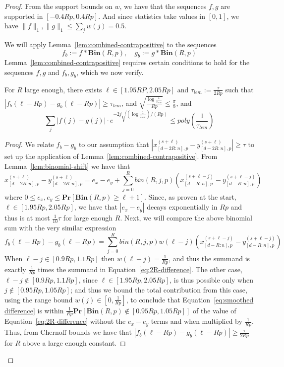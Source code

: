 \documentclass[11pt]{article}
\theoremstyle{plain}
\newcommand{\Bin}[2]{\textbf{Bin}(#1,#2)}
\newcommand{\abs}[1]{\left|#1\right|}
\renewcommand{\Pr}{\textbf{Pr}}
\begin{document}
\begin{proof}
From the support bounds on $w$, we have that the sequences $f,g$ are supported in $[-0.4Rp,0.4Rp]$. And since statistics take values in $[0,1]$, we have $\|f\|_1,\|g\|_1\leq \sum_j w(j) =0.5$. 

We will apply Lemma~\ref{lem:combined-contrapositive} to the sequences
\begin{equation*}
    f_b := f \ast \Bin{R}{p}, \quad g_b := g \ast \Bin{R}{p}
\end{equation*}
Lemma~\ref{lem:combined-contrapositive} requires certain conditions to hold for the sequences $f,g$ and $f_b,g_b$, which we now verify.

\begin{lemma}
    \label{lem:contrapositive-conditions}
    For $R$ large enough, there exists $\ell \in [1.95RP,2.05Rp]$ and $\tau_{lem} := \frac{\tau}{2Rp}$ such that $\abs{f_b(\ell-Rp) - g_b(\ell-Rp)} \geq \tau_{lem}$, and $\sqrt{\frac{\log \frac{1}{\tau_{lem}}}{Rp}} \leq \frac{\pi}{8}$, and \begin{equation}
        \label{eq:left-tail}
        \sum_j |f(j)-g(j)|\cdot e^{-2j\sqrt{(\log\frac{1}{\tau_{lem}})/(Rp)}}\leq poly\left(\frac{1}{\tau_{lem}}\right)
    \end{equation}
\end{lemma}
\begin{proof}
    We relate $f_b-g_b$ to our assumption that $|x_{[d-2R:n],p}^{(s+\ell)}-y_{[d-2R:n],p}^{(s+\ell)}|\geq \tau$ to set up the application of Lemma~\ref{lem:combined-contrapositive}. From Lemma~\ref{lem:binomial-shift} we have that 
    \begin{equation}
        \label{eq:2R-difference}
        x_{[d-2R:n],p}^{(s+\ell)}-y_{[d-2R:n],p}^{(s+\ell)}=e_x-e_y+\sum_{j=0}^R bin(R,j,p)\left(x_{[d-R:n],p}^{(s+\ell-j)}-y_{[d-R:n],p}^{(s+\ell-j)}\right)
    \end{equation}
    where  $0\leq e_x,e_y\leq \Pr[\Bin{R}{p}\geq \ell+1]$. Since, as proven at the start, $\ell\in [1.95Rp,2.05Rp]$, we have that $|e_x-e_y|$ decays exponentially in $Rp$ and thus is at most $\frac{1}{10}\tau$ for large enough $R$. Next, we will compare the above binomial sum with the very similar expression
    \begin{equation}
        \label{eq:smoothed difference}
        f_b(\ell-Rp)-g_b(\ell-Rp)=\sum_{j=0}^R bin(R,j,p) w(\ell-j) \left(x^{(s+\ell-j)}_{[d-R:n],p}-y^{(s+\ell-j)}_{[d-R:n],p}\right)
    \end{equation}
    When $\ell-j\in[0.9Rp,1.1Rp]$ then $w(\ell-j)=\frac{1}{Rp}$, and thus the summand is exactly $\frac{1}{Rp}$ times the summand in Equation~\ref{eq:2R-difference}. The other case, $\ell-j\notin[0.9Rp,1.1Rp]$, since $\ell\in [1.95Rp,2.05Rp]$, is thus possible only when $j\notin [0.95Rp,1.05Rp]$; and thus we bound the total contribution from this case, using the range bound $w(j)\in [0,\frac{1}{Rp}]$, to conclude that Equation~\ref{eq:smoothed difference} is within $\frac{1}{Rp}\Pr[\Bin{R}{p}\notin [0.95Rp,1.05Rp]]$ of the value of Equation~\ref{eq:2R-difference} without the $e_x-e_y$ terms and when multiplied by $\frac{1}{Rp}$. Thus, from Chernoff bounds we have that $|f_b(\ell-Rp)-g_b(\ell-Rp)|\geq \frac{\tau}{2Rp}$ for $R$ above a large enough constant. 


\end{proof}
\end{proof}
\end{document}
